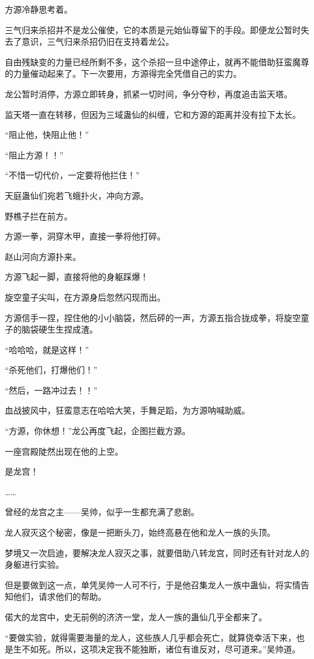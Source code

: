 \begin{this_body}
方源冷静思考着。

三气归来杀招并不是龙公催使，它的本质是元始仙尊留下的手段。即便龙公暂时失去了意识，三气归来杀招仍旧在支持着龙公。

自由残缺变的力量已经所剩不多，这个杀招一旦中途停止，就再不能借助狂蛮魔尊的力量催动起来了。下一次要用，方源得完全凭借自己的实力。

龙公暂时消停，方源立即转身，抓紧一切时间，争分夺秒，再度追击监天塔。

监天塔一直在转移，但因为三域蛊仙的纠缠，它和方源的距离并没有拉下太长。

“阻止他，快阻止他！”

“阻止方源！！”

“不惜一切代价，一定要将他拦住！”

天庭蛊仙们宛若飞蛾扑火，冲向方源。

野樵子拦在前方。

方源一拳，洞穿木甲，直接一拳将他打碎。

赵山河向方源扑来。

方源飞起一脚，直接将他的身躯踩爆！

旋空童子尖叫，在方源身后忽然闪现而出。

方源信手一捏，捏住他的小小脑袋，然后砰的一声，方源五指合拢成拳，将旋空童子的脑袋硬生生捏成渣。

“哈哈哈，就是这样！”

“杀死他们，打爆他们！”

“然后，一路冲过去！！”

血战披风中，狂蛮意志在哈哈大笑，手舞足蹈，为方源呐喊助威。

“方源，你休想！”龙公再度飞起，企图拦截方源。

一座宫殿陡然出现在他的上空。

是龙宫！

……

曾经的龙宫之主——吴帅，似乎一生都充满了悲剧。

龙人寂灭这个秘密，像是一把断头刀，始终高悬在他和龙人一族的头顶。

梦境又一次启迪，要解决龙人寂灭之事，就要借助八转龙宫，同时还有针对龙人的身躯进行实验。

但是要做到这一点，单凭吴帅一人可不行，于是他召集龙人一族中蛊仙，将实情告知他们，请求他们的帮助。

偌大的龙宫中，史无前例的济济一堂，龙人一族的蛊仙几乎全都来了。

“要做实验，就得需要海量的龙人，这些族人几乎都会死亡，就算侥幸活下来，也是生不如死。所以，这项决定我不能独断，诸位有谁反对，尽可道来。”吴帅道。


\end{this_body}
